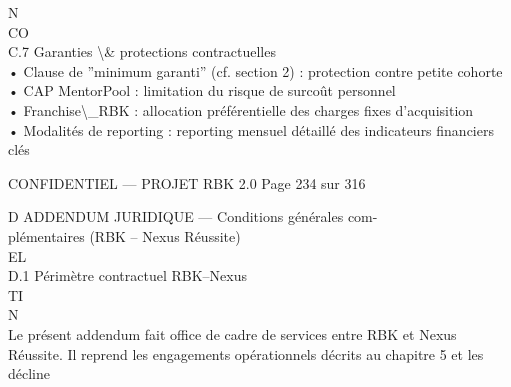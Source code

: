 \documentclass[12pt,landscape,a4paper]{article}
\newenvironment{confidential}
{\begin{tcolorbox}[
    colback=rbkred!5!white,
    colframe=rbkred!75!black,
    title=CONFIDENTIEL,
    fonttitle=\bfseries\color{white},
    coltitle=rbkred!75!black,
    breakable,
    enhanced,
    frame hidden,
    borderline west={2pt}{0pt}{rbkred!75!black}
]}
{\end{tcolorbox}}
\begin{document}
\vspace{0.5em}
\vspace{0.5em}
N\\
CO\\
C.7 Garanties \textbackslash{}& protections contractuelles\\
• Clause de ”minimum garanti” (cf. section 2) : protection contre petite cohorte\\
\vspace{0.5em}
• CAP MentorPool : limitation du risque de surcoût personnel\\
\vspace{0.5em}
• Franchise\textbackslash{}_RBK : allocation préférentielle des charges fixes d’acquisition\\
\vspace{0.5em}
• Modalités de reporting : reporting mensuel détaillé des indicateurs financiers clés\\
\vspace{0.5em}
\vspace{0.5em}
\vspace{0.5em}
\vspace{0.5em}
\begin{confidential}CONFIDENTIEL — PROJET RBK 2.0                                            Page 234 sur 316\end{confidential}
D \textbar{} ADDENDUM JURIDIQUE — Conditions générales com-\\
plémentaires (RBK – Nexus Réussite)\\
\vspace{0.5em}
\vspace{0.5em}
\vspace{0.5em}
\vspace{0.5em}
EL\\
D.1 Périmètre contractuel RBK–Nexus\\
\vspace{0.5em}
\vspace{0.5em}
\vspace{0.5em}
\vspace{0.5em}
TI\\
N\\
Le présent addendum fait office de cadre de services entre RBK et Nexus Réussite. Il reprend les engagements opérationnels décrits au chapitre 5 et les décline\\
\vspace{0.5em}
\vspace{0.5em}
\vspace{0.5em}
\vspace{0.5em}
\end{document}
